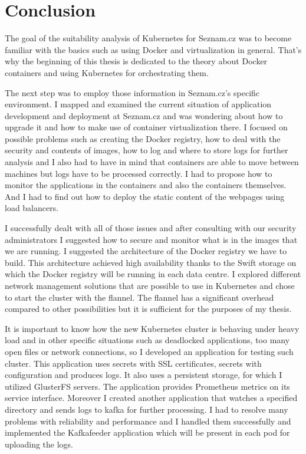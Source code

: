 \chapter{Conclusion}

The goal of the suitability analysis of Kubernetes for Seznam.cz was to become familiar with the basics such as using Docker and virtualization in general. That’s why the beginning of this thesis is dedicated to the theory about Docker containers and using Kubernetes for orchestrating them. 

The next step was to employ those information in Seznam.cz’s specific environment. I mapped and examined the current situation of application development and deployment at Seznam.cz and was wondering about how to upgrade it and how to make use of container virtualization there. I focused on possible problems such as creating the Docker registry, how to deal with the security and contents of images, how to log and where to store logs for further analysis and I also had to have in mind that containers are able to move between machines but logs have to be processed correctly. I had to propose how to monitor the applications in the containers and also the containers themselves. And I had to find out how to deploy the static content of the webpages using load balancers.

I successfully dealt with all of those issues and after consulting with our security administrators I suggested how to secure and monitor what is in the images that we are running. I suggested the architecture of the Docker registry we have to build. This architecture achieved high availability thanks to the Swift storage on which the Docker registry will be running in each data centre. I explored different network management solutions that are possible to use in Kubernetes and chose to start the cluster with the flannel. The flannel has a significant overhead compared to other possibilities but it is sufficient for the purposes of my thesis.

It is important to know how the new Kubernetes cluster is behaving under heavy load and in other specific situations such as deadlocked applications, too many open files or network connections, so I developed an application for testing such cluster. This application uses secrets with SSL certificates, secrets with configuration and produces logs. It also uses a persistent storage, for which I utilized GlusterFS servers. The application provides Prometheus metrics on its service interface. Moreover I created another application that watches a specified directory and sends logs to kafka for further processing. I had to resolve many problems with reliability and performance and I handled them successfully and implemented the Kafkafeeder application which will be present in each pod for uploading the logs.

